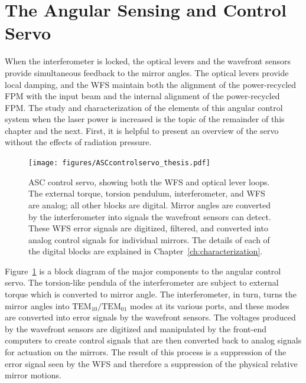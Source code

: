\section{The Angular Sensing and Control Servo}
When the interferometer is locked, the optical levers and the wavefront sensors provide simultaneous feedback to the mirror angles. The optical levers provide local damping, and the WFS maintain both the alignment of the power-recycled FPM with the input beam and the internal alignment of the power-recycled FPM. The study and characterization of the elements of this angular control system when the laser power is increased is the topic of the remainder of this chapter and the next. First, it is helpful to present an overview of the servo without the effects of radiation pressure.

\begin{figure} \begin{centering} 
\texttt{[image: figures/ASCcontrolservo\_thesis.pdf]} 
\caption[ASC control servo]{ASC control servo, showing both the WFS and optical lever loops. The external torque, torsion pendulum, interferometer, and WFS are analog; all other blocks are digital. Mirror angles are converted by the interferometer into signals the wavefront sensors can detect. These WFS error signals are digitized, filtered, and converted into analog control signals for individual mirrors. The details of each of the digital blocks are explained in Chapter~\ref{ch:characterization}.}
\label{fig:ASCcontrolservo}
\end{centering}
\end{figure}

Figure~\ref{fig:ASCcontrolservo} is a block diagram of the major components to the angular control servo. The torsion-like pendula of the interferometer are subject to external torque which is converted to mirror angle. The interferometer, in turn, turns the mirror angles into $\mathrm{TEM}_{10}/\mathrm{TEM}_{01}$ modes at its various ports, and these modes are converted into error signals by the wavefront sensors. The voltages produced by the wavefront sensors are digitized and manipulated by the front-end computers to create control signals that are then converted back to analog signals for actuation on the mirrors. The result of this process is a suppression of the error signal seen by the WFS and therefore a suppression of the physical relative mirror motions. 



